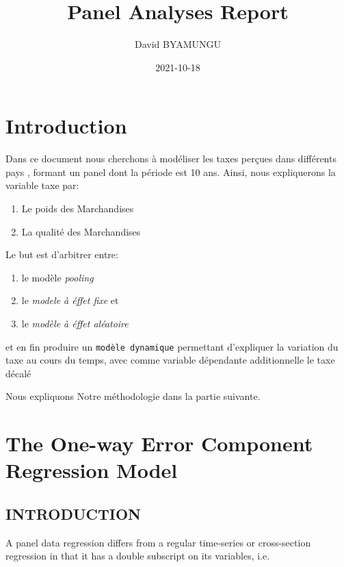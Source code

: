 \documentclass[
]{book}
\title{Panel Analyses Report}
\author{David BYAMUNGU}
\date{2021-10-18}
\providecommand{\tightlist}{%
  \setlength{\itemsep}{0pt}\setlength{\parskip}{0pt}}
\begin{document}
\maketitle

{
\setcounter{tocdepth}{1}
\tableofcontents
}
\hypertarget{intro}{%
\chapter{Introduction}\label{intro}}

Dans ce document nous cherchons à modéliser les taxes perçues dans différents pays , formant un panel dont la période est 10 ans.
Ainsi, nous expliquerons la variable taxe par:

\begin{enumerate}
\def\labelenumi{(\arabic{enumi})}
\tightlist
\item
  Le poids des Marchandises
\item
  La qualité des Marchandises
\end{enumerate}

Le but est d'arbitrer entre:

\begin{enumerate}
\def\labelenumi{(\arabic{enumi})}
\tightlist
\item
  le modèle \emph{pooling}
\item
  le \emph{modele à éffet fixe} et
\item
  le \emph{modèle à éffet aléatoire}
\end{enumerate}

et en fin produire un \texttt{modèle\ dynamique} permettant d'expliquer la variation du taxe au cours du temps, avec comme variable dépendante additionnelle le taxe décalé

Nous expliquons Notre méthodologie dans la partie suivante.

\hypertarget{the-one-way-error-component-regression-model}{%
\chapter{The One-way Error Component Regression Model}\label{the-one-way-error-component-regression-model}}

\hypertarget{introduction}{%
\section{INTRODUCTION}\label{introduction}}

A panel data regression differs from a regular time-series or cross-section regression in that it has a double subscript on its variables, i.e.
\end{document}

